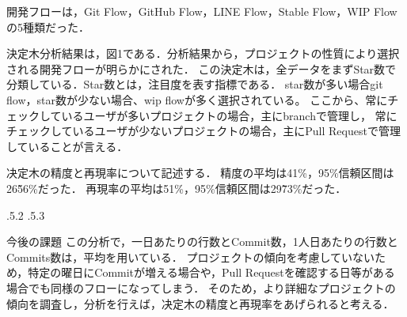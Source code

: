 \documentclass[uplatex,twocolumn]{jsarticle}
\makeatletter
\renewcommand{\section}{%
    \if@slide\clearpage\fi
    \@startsection{section}{1}{\z@}%
    {\Cvs \@plus.5\Cdp \@minus.2\Cdp}%
    {.5\Cvs \@plus.3\Cdp}%
    {\normalfont\raggedright}}
\makeatother
\begin{document}
開発フローは，Git Flow，GitHub Flow，LINE Flow，Stable Flow，WIP Flowの5種類だった．

決定木分析結果は，図1である．分析結果から，プロジェクトの性質により選択される開発フローが明らかにされた．
この決定木は，全データをまずStar数で分類している．Star数とは，注目度を表す指標である．
star数が多い場合git flow，star数が少ない場合、wip flowが多く選択されている。
ここから、常にチェックしているユーザが多いプロジェクトの場合，主にbranchで管理し，
常にチェックしているユーザが少ないプロジェクトの場合，主にPull Requestで管理していることが言える．


决定木の精度と再現率について記述する．
精度の平均は41\%，95\%信頼区間は26\~56\%だった．
再現率の平均は51\%，95\%信頼区間は29\~73\%だった．


\section{今後の課題}
この分析で，一日あたりの行数とCommit数，1人日あたりの行数とCommits数は，平均を用いている．
プロジェクトの傾向を考慮していないため，特定の曜日にCommitが増える場合や，Pull Requestを確認する日等がある場合でも同様のフローになってしまう．
そのため，より詳細なプロジェクトの傾向を調査し，分析を行えば，决定木の精度と再現率をあげられると考える．




\end{document}

